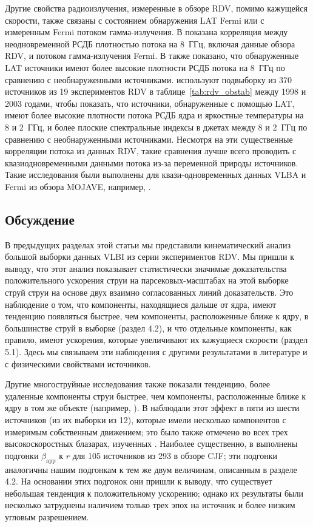 Другие свойства радиоизлучения, измеренные в обзоре RDV, помимо кажущейся скорости, также связаны с
состоянием обнаружения LAT Fermi или с измеренным Fermi потоком гамма-излучения. В
\cite{Kovalev_2009a} показана корреляция между неодновременной РСДБ плотностью потока на 8~ГГц,
включая данные обзора RDV, и потоком гамма-излучения Fermi. В \cite{Kovalev_2009a} также показано,
что обнаруженные LAT источники имеют более высокие плотности РСДБ потока на 8~ГГц по сравнению с
необнаруженными источниками. \cite{Pushkarev_Kovalev_2012} используют подвыборку из 370 источников
из 19
экспериментов RDV в таблице~\ref{tab:rdv_obstab} между 1998 и 2003 годами, чтобы показать, что
источники, обнаруженные с помощью LAT, имеют более высокие плотности потока РСДБ ядра и яркостные
температуры на 8 и 2~ГГц, и более плоские спектральные индексы в джетах между 8 и 2~ГГц по сравнению
с необнаруженными источниками. Несмотря на эти существенные корреляции потока из данных RDV, такие
сравнения лучше всего проводить с квазиодновременными данными потока из-за переменной природы
источников. Такие исследования были выполнены для квази-одновременных данных VLBA и Fermi из обзора
MOJAVE, например, \cite{Kovalev_2009b,Pushkarev_2010,Lister_2011}.

\subsection{Обсуждение}

В предыдущих разделах этой статьи мы представили кинематический анализ большой выборки данных VLBI
из серии экспериментов RDV. Мы пришли к выводу, что этот анализ показывает статистически значимые
доказательства положительного ускорения струи на парсековых-масштабах на этой выборке струй
струи на основе двух взаимно согласованных линий доказательств. Это наблюдение о том, что
компоненты, находящиеся дальше от ядра, имеют тенденцию появляться быстрее, чем компоненты,
расположенные ближе к ядру, в большинстве струй в выборке (раздел 4.2), и что отдельные компоненты,
как правило, имеют ускорения, которые увеличивают их кажущиеся скорости (раздел 5.1). Здесь мы
связываем эти наблюдения с другими результатами в литературе и с физическими свойствами источников.

Другие многоструйные исследования также показали тенденцию, более удаленные компоненты
струи быстрее, чем компоненты, расположенные ближе к ядру в том же объекте (например,
\cite{Homan_2001,Piner_2006,Britzen_2008}). В \cite{Homan_2001} наблюдали этот эффект в пяти из
шести источников (из их выборки из 12), которые имели несколько компонентов с измеримым собственным
движением; это было также отмечено во всех трех высокоскоростных блазарах, изученных
\cite{Piner_2006}. Наиболее существенно, в \cite{Britzen_2008} выполнены подгонки
$\beta_\text{app}$ к $r$ для 105 источников из 293 в обзоре CJF; эти подгонки аналогичны нашим
подгонкам к тем же двум величинам, описанным в разделе 4.2. На основании этих подгонок они пришли к
выводу, что существует небольшая тенденция к положительному ускорению; однако их результаты были
несколько затруднены наличием только трех эпох на источник и более низким угловым разрешением.

